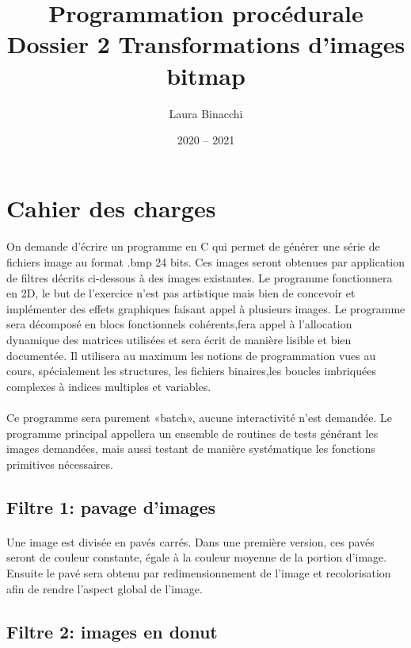 \documentclass{article}
\title{}
\title{Programmation procédurale\bigbreak \bigbreak
    \large Dossier 2\bigbreak
    \normalsize Transformations d’images bitmap\bigbreak}
\date{2020 -- 2021}
\author{Laura Binacchi}
\begin{document}
    
    \newpage
    \tableofcontents
    \newpage

    \section{Cahier des charges}
    \paragraph{}
    On demande d’écrire un programme en C qui permet de générer une série de fichiers image au format .bmp 24 bits. Ces images seront  obtenues par application de filtres décrits ci-dessous à des images existantes. Le programme fonctionnera en 2D, le but de l’exercice n’est pas artistique mais bien de concevoir et implémenter des effets graphiques faisant appel à plusieurs images. Le programme sera décomposé en blocs fonctionnels cohérents,fera appel à l’allocation dynamique des matrices utilisées et sera écrit de manière lisible et bien documentée. Il utilisera au maximum les notions de programmation vues au cours, spécialement les structures, les fichiers binaires,les boucles imbriquées complexes à indices multiples et variables.

    \paragraph{}
    Ce programme sera purement «batch», aucune interactivité n’est demandée. Le programme principal appellera un ensemble de routines de tests générant les images demandées, mais aussi testant de manière systématique les fonctions primitives nécessaires.

    \subsection{Filtre 1: pavage d'images}
    \paragraph{}
    Une image est divisée en pavés carrés. Dans une première version, ces pavés seront de couleur constante, égale à la couleur moyenne de la portion d’image. Ensuite le pavé sera obtenu par redimensionnement de l’image et recolorisation afin de rendre l’aspect global de l’image.

    \subsection{Filtre 2: images en donut}
\end{document}
